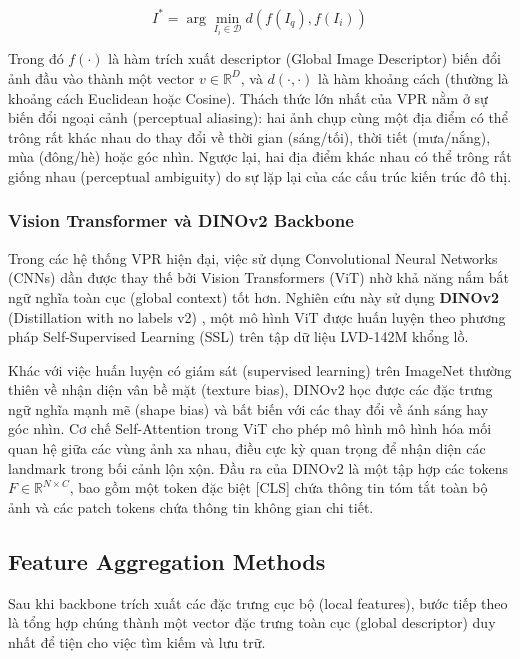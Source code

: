 \documentclass[12pt,a4paper]{article}
\begin{document}
    \begin{equation}
        I^* = \arg\min_{I_i \in \mathcal{D}} d(f(I_q), f(I_i))
    \end{equation}

    Trong đó $f(\cdot)$ là hàm trích xuất descriptor (Global Image Descriptor) biến đổi ảnh đầu vào thành một vector $v \in \mathbb{R}^D$, và $d(\cdot, \cdot)$ là hàm khoảng cách (thường là khoảng cách Euclidean hoặc Cosine). Thách thức lớn nhất của VPR nằm ở sự biến đổi ngoại cảnh (perceptual aliasing): hai ảnh chụp cùng một địa điểm có thể trông rất khác nhau do thay đổi về thời gian (sáng/tối), thời tiết (mưa/nắng), mùa (đông/hè) hoặc góc nhìn. Ngược lại, hai địa điểm khác nhau có thể trông rất giống nhau (perceptual ambiguity) do sự lặp lại của các cấu trúc kiến trúc đô thị.

    \subsubsection{Vision Transformer và DINOv2 Backbone}

    Trong các hệ thống VPR hiện đại, việc sử dụng Convolutional Neural Networks (CNNs) dần được thay thế bởi Vision Transformers (ViT) \cite{dosovitskiy2020image} nhờ khả năng nắm bắt ngữ nghĩa toàn cục (global context) tốt hơn. Nghiên cứu này sử dụng \textbf{DINOv2} (Distillation with no labels v2) \cite{oquab2023dinov2}, một mô hình ViT được huấn luyện theo phương pháp Self-Supervised Learning (SSL) trên tập dữ liệu LVD-142M khổng lồ.

    Khác với việc huấn luyện có giám sát (supervised learning) trên ImageNet thường thiên về nhận diện vân bề mặt (texture bias), DINOv2 học được các đặc trưng ngữ nghĩa mạnh mẽ (shape bias) và bất biến với các thay đổi về ánh sáng hay góc nhìn. Cơ chế Self-Attention \cite{vaswani2017attention} trong ViT cho phép mô hình mô hình hóa mối quan hệ giữa các vùng ảnh xa nhau, điều cực kỳ quan trọng để nhận diện các landmark trong bối cảnh lộn xộn. Đầu ra của DINOv2 là một tập hợp các tokens $F \in \mathbb{R}^{N \times C}$, bao gồm một token đặc biệt [CLS] chứa thông tin tóm tắt toàn bộ ảnh và các patch tokens chứa thông tin không gian chi tiết.

    \subsection{Feature Aggregation Methods}

    Sau khi backbone trích xuất các đặc trưng cục bộ (local features), bước tiếp theo là tổng hợp chúng thành một vector đặc trưng toàn cục (global descriptor) duy nhất để tiện cho việc tìm kiếm và lưu trữ.
\end{document}
